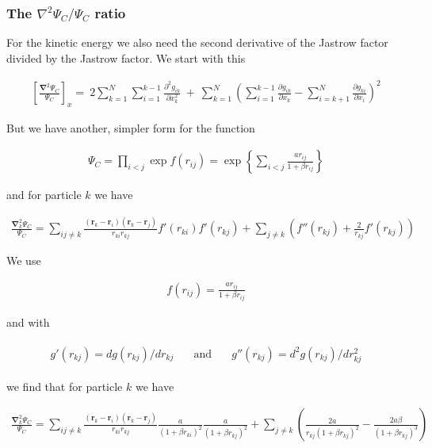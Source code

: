\documentclass[x11names]{article}
\begin{document}
		\subsubsection{The $\nabla^{2} \Psi_{C}/\Psi_{C}$ ratio}
			For the kinetic energy we also need the second derivative of the Jastrow
			factor divided by the Jastrow factor. We start with this

			\begin{align}
				\left[\frac{\mathbf{\nabla}^{2}\Psi_{C}}{\Psi_{C}}\right]_{x}=\ 2\sum_{k=1}^{N}\sum_{i=1}^{k-1}\frac{\partial^{2}g_{ik}}{\partial x_{k}^{2}}\ +\ \sum_{k=1}^{N}\left(\sum_{i=1}^{k-1}\frac{\partial g_{ik}}{\partial x_{k}}-\sum_{i=k+1}^{N}\frac{\partial g_{ki}}{\partial x_{i}}\right)^{2}
			\end{align}

			But we have another, simpler form for the function

			\begin{align}
				\Psi_{C}=\prod_{i<j}\exp f(r_{ij})=\exp\left\{ \sum_{i<j}\frac{ar_{ij}}{1+\beta r_{ij}}\right\}
			\end{align}

			and for particle $k$ we have

			\begin{align}
				\frac{\mathbf{\nabla}_{k}^{2}\Psi_{C}}{\Psi_{C}}=\sum_{ij\ne k}\frac{(\mathbf{r}_{k}-\mathbf{r}_{i})(\mathbf{r}_{k}-\mathbf{r}_{j})}{r_{ki}r_{kj}}f'(r_{ki})f'(r_{kj})+\sum_{j\ne k}\left(f''(r_{kj})+\frac{2}{r_{kj}}f'(r_{kj})\right)
			\end{align}

			We use

			\begin{align}
				f(r_{ij})=\frac{ar_{ij}}{1+\beta r_{ij}}
			\end{align}

			and with

			\begin{align}
				\begin{array}{ccc}
				g'(r_{kj})=dg(r_{kj})/dr_{kj} & \quad\mbox{and}\quad & g''(r_{kj})=d^{2}g(r_{kj})/dr_{kj}^{2}\end{array}
			\end{align}

			we find that for particle $k$ we have

			\begin{align}
				\frac{\mathbf{\nabla}_{k}^{2}\Psi_{C}}{\Psi_{C}}=\sum_{ij\ne k}\frac{(\mathbf{r}_{k}-\mathbf{r}_{i})(\mathbf{r}_{k}-\mathbf{r}_{j})}{r_{ki}r_{kj}}\frac{a}{(1+\beta r_{ki})^{2}}\frac{a}{(1+\beta r_{kj})^{2}}+\sum_{j\ne k}\left(\frac{2a}{r_{kj}(1+\beta r_{kj})^{2}}-\frac{2a\beta}{(1+\beta r_{kj})^{3}}\right)
			\end{align}
\end{document}
